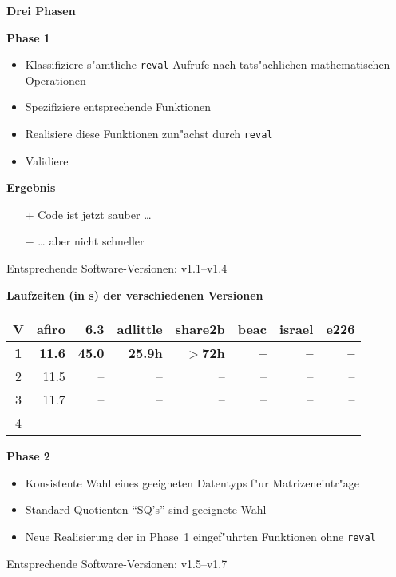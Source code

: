 \documentclass[slidesonly]{seminar}
\newcommand{\scaption}[1]{\centerline{\textbf{\large #1}}\medskip}
\newcommand{\header}[1]{\par\medskip\textbf{\large #1}\par}
\newcommand{\subheader}[1]{\par\textbf{#1}{}}
\begin{document}
%
\begin{slide}
\scaption{Drei Phasen}
\header{Phase 1}
\begin{itemize}
\item Klassifiziere s"amtliche \texttt{reval}-Aufrufe nach
tats"achlichen mathematischen Operationen
\item Spezifiziere entsprechende Funktionen
\item Realisiere diese Funktionen zun"achst durch \texttt{reval}
\item Validiere
\end{itemize}
\subheader{Ergebnis}
\begin{itemize}
\item[$+$] Code ist jetzt sauber \dots
\item[$-$] \dots{} aber nicht schneller
\end{itemize}
Entsprechende Software-Versionen: v1.1--v1.4
\end{slide}
%
\begin{slide}
\scaption{Laufzeiten (in s) der verschiedenen Versionen}
\begin{center}
\begin{small}
\begin{tabular}{crrrrrrr}
\hline
V  & afiro & 6.3 & adlittle & share2b & beac & israel & e226\\
\hline
\textbf{1} & \textbf{11.6} \textbf{} & \textbf{45.0}
\textbf{} &  \textbf{25.9h} \textbf{} &\textbf{$>$72h}
& \textbf{--} & \textbf{--} & \textbf{--} \\
2 & 11.5  & -- & -- & -- & -- & -- & -- \\
3 & 11.7  & -- & --  & -- & -- & -- & -- \\
4 & -- & -- & -- & -- & -- & -- & -- 	\\
\hline
\end{tabular}
\end{small}
\end{center}
\end{slide}
%
\begin{slide}
\header{Phase 2}
\begin{itemize}
\item
Konsistente Wahl eines geeigneten Datentyps f"ur Matrizeneintr"age
\item
Standard-Quotienten "`SQ's"' sind geeignete Wahl
\item
Neue Realisierung der in Phase~1 eingef"uhrten Funktionen ohne
\texttt{reval}
\end{itemize}
Entsprechende Software-Versionen: v1.5--v1.7
\end{slide}
\end{document}
